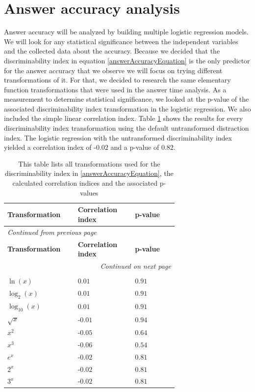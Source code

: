 \section{Answer accuracy analysis}
Answer accuracy will be analyzed by building multiple logistic regression models. We will look for any statistical significance between the independent
variables and the collected data about the accuracy. Because we decided that the discriminability index in equation \ref{answerAccuracyEquation}
is the only predictor for the answer accuracy that we observe we will focus on trying different transformations of it.
For that, we decided to research the same elementary function transformations that were used in the answer time
analysis. As a measurement to determine statistical significance, we looked at the p-value of the associated discriminability index transformation
in the logistic regression. We also included the simple linear correlation index. Table \ref{discriminabilityIndexTransformation} shows
the results for every discriminability index transformation using the default untransformed distraction index.
The logistic regression with the untransformed discriminability index yielded a correlation index of -$0.02$ and a p-value of $0.82$.
\begin{longtable}{| p{0.24\linewidth} | p{0.25\linewidth} | p{0.20\linewidth}|}
    \hline
    \textbf{Transformation} & \textbf{Correlation index} & \textbf{p-value} \\
    \hline
    \endfirsthead
    \multicolumn{3}{l}{{\textit{Continued from previous page}}} \\
    \hline
    \textbf{Transformation} & \textbf{Correlation index} & \textbf{p-value} \\
    \hline
    \endhead
    \hline \multicolumn{3}{r}{{\textit{Continued on next page}}} \\
    \endfoot
    \hline
    \caption{This table lists all transformations used for the discriminability index in \ref{answerAccuracyEquation}, the calculated correlation indices and the associated p-values \label{discriminabilityIndexTransformation}}\\
    \endlastfoot
    $ \ln(x) $ & $0.01$ & $0.91$ \\
    \hline
    $ \log_{2}(x) $ & $0.01$ & $0.91$ \\
    \hline
    $ \log_{10}(x) $ & $0.01$ & $0.91$ \\
    \hline
    $ \sqrt{x} $ & -$0.01$ & $0.94$ \\
    \hline
    $ x^2 $ & -$0.05$ & $0.64$ \\
    \hline
    $ x^3 $ & -$0.06$ & $0.54$ \\
    \hline
    $ e^x $ & -$0.02$ & $0.81$ \\
    \hline
    $ 2^x $ & -$0.02$ & $0.81$ \\
    \hline
    $ 3^x $ & -$0.02$ & $0.81$ \\
\end{longtable}

